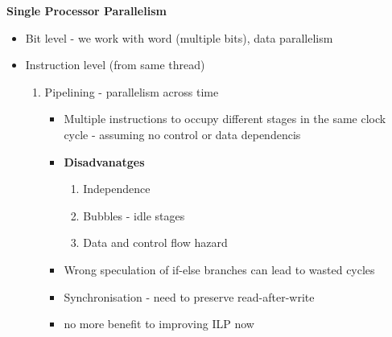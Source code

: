 \documentclass[10pt, landscape]{article}
\begin{document}
\begin{multicols}{4}
\textbf{Single Processor Parallelism}
\begin{itemize}
    \item Bit level - we work with word (multiple bits), data parallelism
    \item Instruction level (from same thread)
    \begin{enumerate}
        \item Pipelining - parallelism across time
        \begin{itemize}
            \item Multiple instructions to occupy different stages in the same clock cycle - assuming no control or data dependencis
            \item \textbf{Disadvanatges}
            \begin{enumerate}
                \item Independence 
                \item Bubbles - idle stages
                \item Data and control flow hazard
            \end{enumerate}
            \item Wrong speculation of if-else branches can lead to wasted cycles
            \item Synchronisation - need to preserve read-after-write 
            \item no more benefit to improving ILP now


\end{itemize}
\end{enumerate}
\end{itemize}
\end{multicols}
\end{document}
